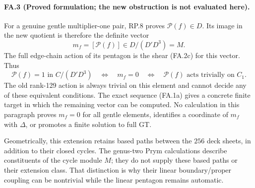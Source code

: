 \paragraph{FA.3 (Proved formulation; the new obstruction is not evaluated here).}
For a genuine gentle multiplier-one pair, RP.8
proves $\mathcal P(f)\in D$. Its image in the
new quotient is therefore the definite vector
\[
           m_f=[\mathcal P(f)]\in D/(D'D^3)=M.
 \tag{FA.3a}
\]
The full edge-chain action of its pentagon is
the shear (FA.2c) for this vector. Thus
\[
 \mathcal P(f)=1\text{ in }C/(D'D^3)
 \quad\Longleftrightarrow\quad m_f=0
 \quad\Longleftrightarrow\quad
 \mathcal P(f)\text{ acts trivially on }C_1.
 \tag{FA.3b}
\]
The old rank-129 action is always trivial on
this element and cannot decide any of these
equivalent conditions. The exact sequence
(FA.1a) gives a concrete finite target in
which the remaining vector can be computed.
No calculation in this paragraph proves
$m_f=0$ for all gentle elements, identifies
a coordinate of $m_f$ with $\Delta$, or
promotes a finite solution to full GT.

Geometrically, this extension retains based
paths between the $256$ deck sheets, in
addition to their closed cycles. The genus-two
Prym calculations describe constituents of
the cycle module $M$; they do not supply
these based paths or their extension class.
That distinction is why their linear
boundary/proper coupling can be nontrivial
while the linear pentagon remains automatic.
